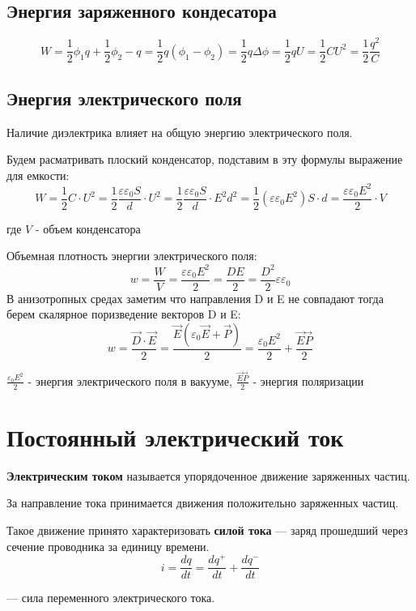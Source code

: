 \documentclass[../main.tex]{subfiles}
\begin{document}
\subsection{Энергия заряженного кондесатора}

\[ W = \frac{1}{2}\phi_1 q + \frac{1}{2}\phi_2 -q = \frac{1}{2}q (\phi_1 - \phi_2) = \frac{1}{2} q \Delta \phi
    = \frac{1}{2} q U = \frac{1}{2} C U^2 =\frac{1}{2} \frac{q^2}{C}\]
\subsection{Энергия электрического поля}
Наличие диэлектрика влияет на общую энергию электрического поля.

Будем расматривать плоский конденсатор, подставим в эту формулы выражение для емкости:
\[ W = \frac{1}{2} C \cdot U^2 = \frac{1}{2} \frac{\varepsilon \varepsilon_0 S}{d} \cdot U^2 = \frac{1}{2} \frac{\varepsilon \varepsilon_0 S}{d} \cdot E^2 d^2 = \frac{1}{2}(\varepsilon \varepsilon_0 E^2) S \cdot d =
    \frac{\varepsilon \varepsilon_ 0 E^2}{2} \cdot V\]
\begin{center}
    где $V$ - объем конденсатора
\end{center}

Объемная плотность энергии электрического поля:
\[w = \frac{W}{V} = \frac{\varepsilon \varepsilon_ 0 E^2}{2} = \frac{D E}{2} = \frac{D^2}{2} \varepsilon \varepsilon_0\]
В анизотропных средах заметим что направления D и E не совпадают тогда берем скалярное поризведение векторов D и E:
\[w = \frac{\vec D \cdot \vec E}{2} = \frac{\vec E (\varepsilon_0 \vec E + \vec P)}{2} = \frac{\varepsilon_0 E^2}{2} + \frac{\vec E \vec P}{2}\]
\begin{center}
    $\frac{\varepsilon_0 E^2}{2}$ - энергия электрического поля в вакууме,
    \newline
    $\frac{\vec E \vec P}{2}$ - энергия поляризации
\end{center}

\section{Постоянный электрический ток}

 \textbf{Электрическим током} называется упорядоченное движение заряженных частиц.

За направление тока принимается движения положительно заряженных частиц.

 Такое движение принято характеризовать \textbf{силой тока}  --- заряд прошедший через сечение проводника за единицу времени.
\[i = \frac{dq}{dt} = \frac{dq ^{+}}{dt} + \frac{dq ^{-}}{dt}\]
\begin{center}
    --- сила переменного электрического тока.
\end{center}
\end{document}
